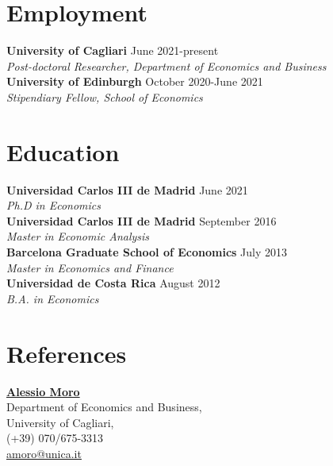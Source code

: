 \documentclass[margin]{res} %
\begin{document}
\begin{resume}

 
\section{Employment}
{\bf University of Cagliari} \hfill June 2021-present  \\
{\sl Post-doctoral Researcher, Department of Economics and Business} \\
{\bf University of Edinburgh} \hfill October 2020-June 2021  \\
{\sl Stipendiary Fellow, School of Economics} 


\section{Education}
{\bf Universidad Carlos III de Madrid} \hfill June 2021  \\
{\sl Ph.D in Economics} \\
{\bf Universidad Carlos III de Madrid} \hfill September 2016 \\
{\sl Master in Economic Analysis} \\
{\bf Barcelona Graduate School of Economics} \hfill July 2013 \\
{\sl Master in Economics and Finance}  \\
{\bf Universidad de Costa Rica} \hfill August 2012 \\
{\sl B.A. in Economics}

\section{References}
\begin{multicols}{2}
	
	\href{http://http://www.alessiomoro.it/}{\bf{Alessio Moro}} \\
	Department of Economics and Business, \\
	University of Cagliari, \\
	(+39) 070/675-3313 \\
	\href{mailto:amoro@unica.it}{amoro@unica.it}
	

\end{multicols}
\end{resume}
\end{document}
